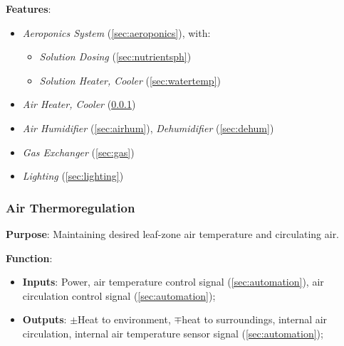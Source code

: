 \documentclass{../tex/report}
\begin{document}
\textbf{Features}:
\begin{itemize}
    \item \textit{Aeroponics System} (\ref{sec:aeroponics}), with:
    \begin{itemize}
        \item \textit{Solution Dosing} (\ref{sec:nutrientsph})
        \item \textit{Solution Heater, Cooler} (\ref{sec:watertemp})
    \end{itemize}
    \item \textit{Air Heater, Cooler} (\ref{sec:airthermoregulation})
    \item \textit{Air Humidifier} (\ref{sec:airhum}), \textit{Dehumidifier} (\ref{sec:dehum})
    \item \textit{Gas Exchanger} (\ref{sec:gas})
    \item \textit{Lighting} (\ref{sec:lighting})
\end{itemize}

\newpage

\subsubsection{Air Thermoregulation}
\label{sec:airthermoregulation}

\textbf{Purpose}: Maintaining desired leaf-zone air temperature and circulating air.

\textbf{Function}:
\begin{itemize}
    \item \textbf{Inputs}: Power, air temperature control signal (\ref{sec:automation}), air circulation control signal (\ref{sec:automation});
    \item \textbf{Outputs}: $\pm$Heat to environment, $\mp$heat to surroundings, internal air circulation, internal air temperature sensor signal (\ref{sec:automation});
\end{itemize}
\end{document}
